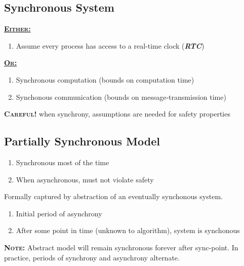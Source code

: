 \documentclass{article}
\begin{document}
\begin{adjustwidth}{2em}{2em}
		\subsection{Synchronous System}
		\begin{adjustwidth}{2em}{2em}
			\underline{\textbf{\textsc{Either:}}} \\
			\begin{enumerate}[-]
				\item Assume every process has access to a real-time clock (\textit{\textbf{RTC}})
			\end{enumerate}
			\underline{\textbf{\textsc{Or:}}}
			\begin{enumerate}[-]
				\item Synchronous computation (bounds on computation time)
				\item Synchonous communication (bounds on message-transmission time)
			\end{enumerate}
			\textsc{\textbf{Careful!}} when synchrony, assumptions are needed for safety properties
		\end{adjustwidth}
		\subsection{Partially Synchronous Model}
		\begin{adjustwidth}{2em}{2em}
			\begin{enumerate}[-]
				\item Synchronous most of the time
				\item When asynchronous, must not violate safety
			\end{enumerate}
			Formally captured by abstraction of an eventually synchonous system.
			\begin{enumerate}[-]
				\item Initial period of asynchrony
				\item After some point in time (unknown to algorithm), system is synchonous
			\end{enumerate}
			\textsc{\textbf{Note:}} Abstract model will remain synchronous forever after sync-point. In practice, periods of synchrony and asynchrony alternate.
		\end{adjustwidth}

\end{adjustwidth}
\end{document}
